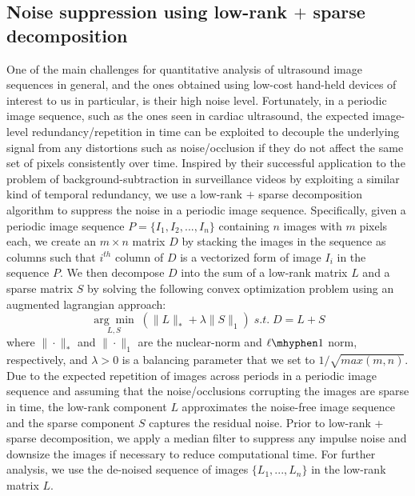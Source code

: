 \documentclass[runningheads,a4paper]{llncs}
\newcommand{\argmin}[1]{\underset{#1}{\operatorname{arg}\operatorname{min}}\;}
\begin{document}
\subsection{Noise suppression using low-rank $+$ sparse decomposition}
\label{sec:method:de-noising}
One of the main challenges for quantitative analysis of ultrasound image sequences in general, and the ones obtained using low-cost hand-held devices of interest to us in particular, is their high noise level. Fortunately, in a periodic image sequence, such as the ones seen in cardiac ultrasound, the expected image-level redundancy/repetition in time can be exploited to decouple the underlying signal from any distortions such as noise/occlusion if they do not affect the same set of pixels consistently over time. Inspired by their successful application to the problem of background-subtraction in surveillance videos\cite{Candes2009} by exploiting a similar kind of temporal redundancy, we use a low-rank $+$ sparse decomposition algorithm to suppress the noise in a periodic image sequence. Specifically, given a periodic image sequence $P = \{I_1, I_2, ..., I_n\}$ containing $n$ images with $m$ pixels each, we create an $m \times n$ matrix $D$ by stacking the images in the sequence as columns such that $i^{th}$ column of $D$ is a vectorized form of  image $I_i$ in the sequence $P$. We then decompose $D$ into the sum of a low-rank matrix $L$ and a sparse matrix $S$ by solving the following convex optimization problem using an augmented lagrangian approach:
\begin{equation}
\argmin{L,S}\left(\|L\|_{*} + \lambda \|S\|_1\right) 
\; s.t. \; D = L + S
\end{equation}
where $\| \cdot \|_*$ and $\| \cdot \|_1$ are the nuclear-norm and $\ell \mhyphen 1$ norm, respectively, and $\lambda > 0$ is a balancing parameter that we set to $1/{\sqrt{max\left(m,n\right)}}$. Due to the expected repetition of images across periods in a periodic image sequence and assuming that the noise/occlusions corrupting the images are sparse in time, the low-rank component $L$ approximates the noise-free image sequence and the sparse component $S$ captures the residual noise. Prior to low-rank + sparse decomposition, we apply a median filter to suppress any impulse noise and downsize the images if necessary to reduce computational time. For further analysis, we use the de-noised sequence of images $\{L_1, ..., L_n\}$ in the low-rank matrix $L$.
%
%
\end{document}

